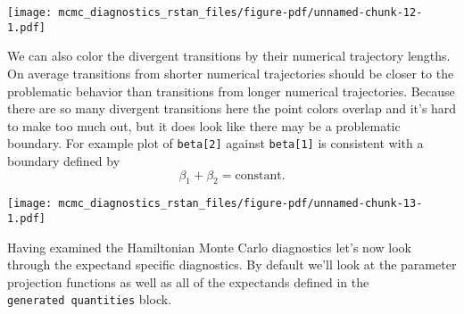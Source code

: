 \documentclass[
  letterpaper,
  DIV=11,
  numbers=noendperiod]{scrartcl}
\newenvironment{Shaded}{\begin{snugshade}}{\end{snugshade}}
\newcommand{\AttributeTok}[1]{\textcolor[rgb]{0.40,0.45,0.13}{#1}}
\newcommand{\ControlFlowTok}[1]{\textcolor[rgb]{0.00,0.23,0.31}{#1}}
\newcommand{\DecValTok}[1]{\textcolor[rgb]{0.68,0.00,0.00}{#1}}
\newcommand{\FunctionTok}[1]{\textcolor[rgb]{0.28,0.35,0.67}{#1}}
\newcommand{\NormalTok}[1]{\textcolor[rgb]{0.00,0.23,0.31}{#1}}
\newcommand{\OtherTok}[1]{\textcolor[rgb]{0.00,0.23,0.31}{#1}}
\newcommand{\SpecialCharTok}[1]{\textcolor[rgb]{0.37,0.37,0.37}{#1}}
\newcommand{\StringTok}[1]{\textcolor[rgb]{0.13,0.47,0.30}{#1}}
\begin{document}
\begin{Shaded}
\end{Shaded}

\texttt{[image: mcmc\_diagnostics\_rstan\_files/figure-pdf/unnamed-chunk-12-1.pdf]}

We can also color the divergent transitions by their numerical
trajectory lengths. On average transitions from shorter numerical
trajectories should be closer to the problematic behavior than
transitions from longer numerical trajectories. Because there are so
many divergent transitions here the point colors overlap and it's hard
to make too much out, but it does look like there may be a problematic
boundary. For example plot of \texttt{beta{[}2{]}} against
\texttt{beta{[}1{]}} is consistent with a boundary defined by \[
\beta_{1} + \beta_{2} = \mathrm{constant}.
\]

\begin{Shaded}
\end{Shaded}

\texttt{[image: mcmc\_diagnostics\_rstan\_files/figure-pdf/unnamed-chunk-13-1.pdf]}

Having examined the Hamiltonian Monte Carlo diagnostics let's now look
through the expectand specific diagnostics. By default we'll look at the
parameter projection functions as well as all of the expectands defined
in the \texttt{generated\ quantities} block.
\end{document}
